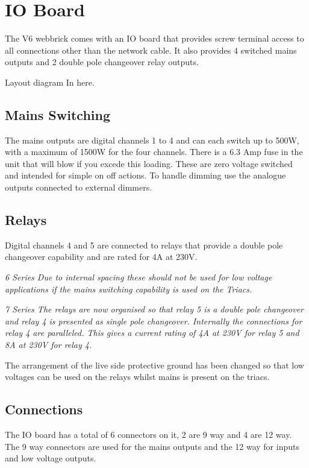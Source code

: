 \section{IO Board}
The V6 webbrick comes with an IO board that provides screw terminal access to all connections other than the 
network cable. It also provides 4 switched mains outputs and 2 double pole changeover relay outputs.

Layout diagram In here.

\subsection{Mains Switching}
The mains outputs are digital channels 1 to 4 and can each switch up to 500W, with a maximum of 1500W for the four channels.
There is a 6.3 Amp fuse in the unit that will blow if you excede this loading. These are zero voltage switched and intended 
for simple on off actions. To handle dimming use the analogue outputs connected to external dimmers.

\subsection{Relays}
Digital channels 4 and 5 are connected to relays that provide a double pole changeover capability and are rated for 4A at 230V. 

\em{6 Series} Due to internal spacing these should not be used for low voltage applications if the mains switching capability is 
used on the Triacs.

\em{7 Series} The relays are now organised so that relay 5 is a double pole changeover and relay 4 is presented as single pole changeover.  
Internally the connections for relay 4 are paralleled.  This gives a current rating of 4A at 230V for relay 5 and 8A at 230V for relay 4.

The arrangement of the live side protective ground has been changed so that low voltages can be used on the relays whilst mains is present on the triacs. 



\subsection{Connections}

The IO board has a total of 6 connectors on it, 2 are 9 way and 4 are 12 way. The 9 way connectors are used for the 
mains outputs and the 12 way for inputs and low voltage outputs.


